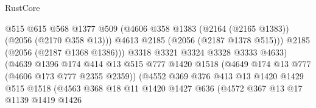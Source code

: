 \begin{lexlean}{RustCore}
\begin{coremodule}
                                          @515
                                          @615
                                          @568
                                          @1377
                                          @509
                                          (@4606
                                            @358
                                            @1383
                                            (@2164 (@2165 @1383))
                                            (@2056 (@2170 @358 @13)))
                                          @4613
                                          @2185
                                          (@2056 (@2187 @1378 @515)))
                                        @2185
                                        (@2056 (@2187 @1368 @1386)))
                                      @3318
                                      @3321
                                      @3324
                                      @3328
                                      @3333
                                      @4633)
                                    (@4639
                                      @1396
                                      @174
                                      @414
                                      @13
                                      @515
                                      @777
                                      @1420
                                      @1518
                                      (@4649 @174 @13 @777 (@4606 @173 @777 @2355 @2359))
                                      (@4552
                                        @369
                                        @376
                                        @413
                                        @13
                                        @1420
                                        @1429
                                        @515
                                        @1518
                                        (@4563
                                          @368
                                          @18
                                          @11
                                          @1420
                                          @1427
                                          @636
                                          (@4572
                                            @367
                                            @13
                                            @17
                                            @1139
                                            @1419
                                            @1426

\end{coremodule}
\end{lexlean}
